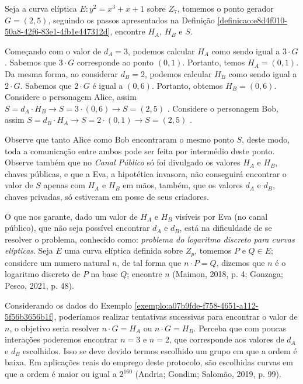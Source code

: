 \begin{exemplo} \label{exemplo:a07b9fde-f758-4651-a112-5f56b3656b1f}
	Seja a curva elíptica $E: y^2 = x^3 + x + 1$ sobre $Z_{7}$, tomemos o ponto gerador $G = (2, 5)$,  seguindo os passos apresentados na Definição \ref{definicao:e8d4f010-50a8-42f6-83e1-4fb1e447312d}, encontre $H_A$, $H_B$ e $S$.

	Começando com o valor de $d_A = 3$, podemos calcular $H_A$ como sendo igual a
	$3 \cdot G$. Sabemos que $3 \cdot G$ corresponde ao ponto $(0, 1)$. Portanto,
	temos $H_A = (0, 1)$. Da mesma forma, ao considerar $d_B = 2$, podemos calcular
	$H_B$ como sendo igual a $2 \cdot G$. Sabemos que $2 \cdot G$ é igual a $(0,
		6)$. Portanto, obtemos $H_B = (0, 6)$. Considere o personagem Alice, assim $S =
		d_A \cdot H_B \rightarrow S = 3 \cdot (0, 6) \rightarrow S = (2, 5)$ .
	Considere o personagem Bob, assim $S = d_B \cdot H_A \rightarrow S = 2\cdot (0,
		1) \rightarrow S = (2, 5)$ .

	Observe que tanto Alice como Bob encontraram o mesmo ponto $S$, deste modo,
	toda a comunicação entre ambos pode ser feita por intermédio deste ponto.
	Observe também que no \textit{Canal Público} só foi divulgado os valores $H_A$
	e $H_B$, chaves públicas, e que a Eva, a hipotética invasora, não conseguirá
	encontrar o valor de $S$ apenas com $H_A$ e $H_B$ em mãos, também, que os
	valores $d_A$ e $d_B$, chaves privadas, só estiveram em posse de seus
	criadores.
\end{exemplo}

O que nos garante, dado um valor de $H_A$ e $H_B$ visíveis por Eva (no canal
público), que não seja possível encontrar $d_A$ e $d_B$, está na dificuldade de
se resolver o problema, conhecido como: \textit{problema do logaritmo discreto
	para curvas elípticas}. Seja $E$ uma curva elíptica definida sobre $Z_{p}$,
tomemos $P$ e $Q \in E$; considere um numero natural $n$, de tal forma que $n
	\cdot P = Q$, dizemos que $n$ é o logaritmo discreto de $P$ na base $Q$;
encontre $n$ (Maimon, 2018, p. 4; Gonzaga; Pesco, 2021, p. 48).

Considerando os dados do Exemplo
\ref{exemplo:a07b9fde-f758-4651-a112-5f56b3656b1f}, poderíamos realizar
tentativas sucessivas para encontrar o valor de $n$, o objetivo seria resolver
$n \cdot G = H_A$ ou $n \cdot G = H_B$. Perceba que com poucas interações
poderemos encontrar $n = 3$ e $n = 2$, que corresponde aos valores de $d_A$ e
$d_B$ escolhidos. Isso se deve devido termos escolhido um grupo em que a ordem
é baixa. Em aplicações reais do emprego deste protocolo, são escolhidas curvas
em que a ordem é maior ou igual a $2^{160}$ (Andria; Gondim; Salomão, 2019, p.
99).

